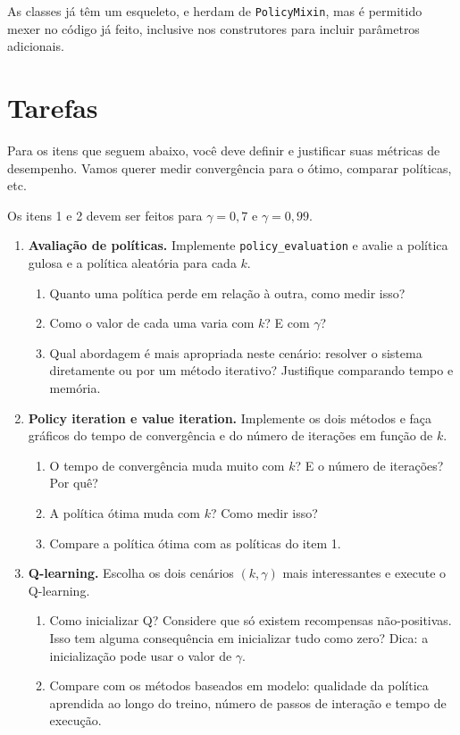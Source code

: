 \documentclass[11pt,a4paper]{article}
\newcommand{\code}[1]{\texttt{#1}}
\begin{document}
As classes já têm um esqueleto, e herdam de \code{PolicyMixin}, mas é permitido mexer no código já
feito, inclusive nos construtores para incluir parâmetros adicionais.

\section{Tarefas}

Para os itens que seguem abaixo, você deve definir e justificar suas métricas de desempenho. Vamos
querer medir convergência para o ótimo, comparar políticas, etc.

Os itens 1 e 2 devem ser feitos para $\gamma = 0{,}7$ e $\gamma = 0{,}99$.

\begin{enumerate}
  \item \textbf{Avaliação de políticas.} Implemente \code{policy\_evaluation} e avalie a política
    gulosa e a política aleatória para cada $k$.
    \begin{enumerate}[label=(\alph*)]
      \item Quanto uma política perde em relação à outra, como medir isso?
      \item Como o valor de cada uma varia com $k$? E com $\gamma$?
      \item Qual abordagem é mais apropriada neste cenário: resolver o sistema diretamente ou por
        um método iterativo? Justifique comparando tempo e memória.
    \end{enumerate}

  \item \textbf{Policy iteration e value iteration.} Implemente os dois métodos e faça gráficos do
    tempo de convergência e do número de iterações em função de $k$.
    \begin{enumerate}[label=(\alph*)]
      \item O tempo de convergência muda muito com $k$? E o número de iterações? Por quê?
      \item A política ótima muda com $k$? Como medir isso?
      \item Compare a política ótima com as políticas do item 1.
    \end{enumerate}

  \item \textbf{Q-learning.} Escolha os dois cenários $(k, \gamma)$ mais interessantes e execute o
    Q-learning.
    \begin{enumerate}[label=(\alph*)]
      \item Como inicializar Q? Considere que só existem recompensas não-positivas. Isso tem alguma
        consequência em inicializar tudo como zero? Dica: a inicialização pode usar o valor de
        $\gamma$.
      \item Compare com os métodos baseados em modelo: qualidade da política aprendida ao longo do
        treino, número de passos de interação e tempo de execução.
    \end{enumerate}
\end{enumerate}
\end{document}
